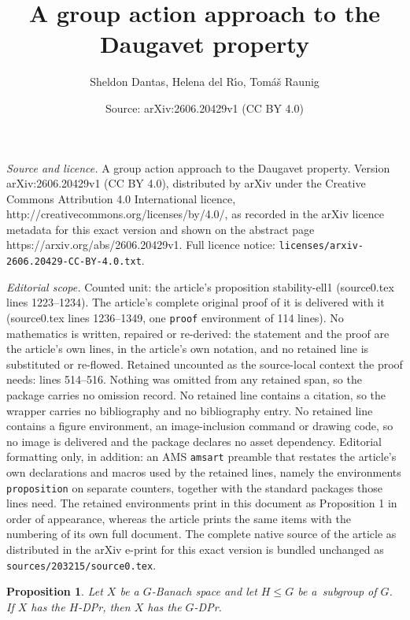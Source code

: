 \documentclass[10pt,a4paper]{amsart}
\title{A group action approach to the Daugavet property}
\author{Sheldon Dantas, Helena del R\'{\i}o, Tomáš Raunig}
\date{Source: arXiv:2606.20429v1 (CC BY 4.0)}
\newtheorem{proposition}{Proposition}
\renewcommand{\leq}{\leqslant}
\begin{document}
\maketitle

\noindent\emph{Source and licence.} A group action approach to the Daugavet property. Version arXiv:2606.20429v1 (CC BY 4.0), distributed by arXiv under the Creative Commons Attribution 4.0 International licence, http://creativecommons.org/licenses/by/4.0/, as recorded in the arXiv licence metadata for this exact version and shown on the abstract page https://arxiv.org/abs/2606.20429v1. Full licence notice: \texttt{licenses/arxiv-2606.20429-CC-BY-4.0.txt}.\par\smallskip

\noindent\textit{Editorial scope.} Counted unit: the article's proposition stability-ell1 (source0.tex lines 1223--1234). The article's complete original proof of it is delivered with it (source0.tex lines 1236--1349, one \texttt{proof} environment of 114 lines). No mathematics is written, repaired or re-derived: the statement and the proof are the article's own lines, in the article's own notation, and no retained line is substituted or re-flowed.  Retained uncounted as the source-local context the proof needs: lines 514--516.  Nothing was omitted from any retained span, so the package carries no omission record.  No retained line contains a citation, so the wrapper carries no bibliography and no bibliography entry.  No retained line contains a figure environment, an image-inclusion command or drawing code, so no image is delivered and the package declares no asset dependency.  Editorial formatting only, in addition: an AMS \texttt{amsart} preamble that restates the article's own declarations and macros used by the retained lines, namely the environments \texttt{proposition} on separate counters, together with the standard packages those lines need.  The retained environments print in this document as Proposition 1 in order of appearance, whereas the article prints the same items with the numbering of its own full document.  The complete native source of the article as distributed in the arXiv e-print for this exact version is bundled unchanged as \texttt{sources/203215/source0.tex}.
	\begin{proposition} \label{fact-DP-implies-GDP}
		Let $X$ be a $G$-Banach space and let $H \leq G$ be a~subgroup of $G$. If $X$ has the $H$-DPr, then $X$ has the $G$-DPr. 
	\end{proposition}
\end{document}
